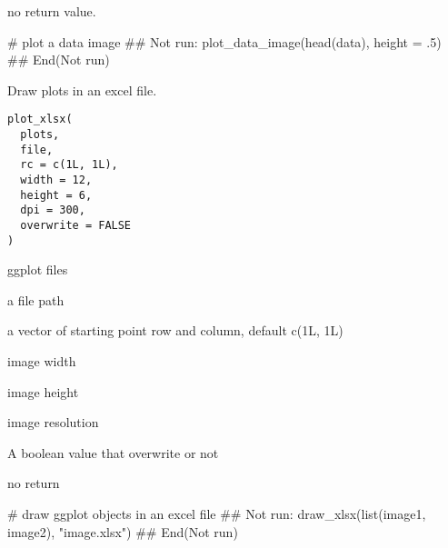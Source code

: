 \documentclass[letterpaper]{book}
\begin{document}
%
\begin{Value}
no return value.
\end{Value}
%
\begin{Examples}
\begin{ExampleCode}
# plot a data image
## Not run: 
plot_data_image(head(data), height = .5)
## End(Not run)

\end{ExampleCode}
\end{Examples}
%
\begin{Description}
Draw plots in an excel file.
\end{Description}
%
\begin{Usage}
\begin{verbatim}
plot_xlsx(
  plots,
  file,
  rc = c(1L, 1L),
  width = 12,
  height = 6,
  dpi = 300,
  overwrite = FALSE
)
\end{verbatim}
\end{Usage}
%
\begin{Arguments}
\begin{ldescription}
\item[\code{plots}] ggplot files

\item[\code{file}] a file path

\item[\code{rc}] a vector of starting point row and column, default c(1L, 1L)

\item[\code{width}] image width

\item[\code{height}] image height

\item[\code{dpi}] image resolution

\item[\code{overwrite}] A boolean value that overwrite or not
\end{ldescription}
\end{Arguments}
%
\begin{Value}
no return
\end{Value}
%
\begin{Examples}
\begin{ExampleCode}
# draw ggplot objects in an excel file
## Not run: 
draw_xlsx(list(image1, image2), "image.xlsx")
## End(Not run)

\end{ExampleCode}
\end{Examples}
\end{document}
